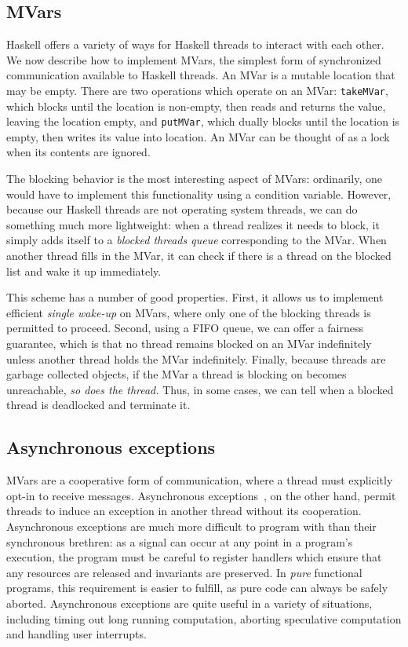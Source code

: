 \subsection{MVars}
\label{sec:MVar}

Haskell offers a variety of ways for Haskell threads to interact with
each other.  We now describe how to implement MVars, the simplest form
of synchronized communication available to Haskell threads.  An MVar is
a mutable location that may be empty.  There are two operations which
operate on an MVar: \verb|takeMVar|, which blocks until the location is
non-empty, then reads and returns the value, leaving the location empty,
and \verb|putMVar|, which dually blocks until the location is empty,
then writes its value into location.  An MVar can be thought of as a
lock when its contents are ignored.

The blocking behavior is the most interesting aspect of MVars:
ordinarily, one would have to implement this functionality using a
condition variable.  However, because our Haskell threads are not
operating system threads, we can do something much more lightweight:
when a thread realizes it needs to block, it simply adds itself to a
\emph{blocked threads queue} corresponding to the MVar.  When another
thread fills in the MVar, it can check if there is a thread on the
blocked list and wake it up immediately.

This scheme has a number of good properties.  First, it allows us
to implement efficient \emph{single wake-up} on MVars, where only one of
the blocking threads is permitted to proceed. Second, using a FIFO
queue, we can offer a fairness guarantee, which is that no thread
remains blocked on an MVar indefinitely unless another thread holds the
MVar indefinitely.  Finally, because threads are garbage collected
objects, if the MVar a thread is blocking on becomes unreachable,
\emph{so does the thread.}  Thus, in some cases, we can tell when
a blocked thread is deadlocked and terminate it.

\subsection{Asynchronous exceptions}
\label{sec:asynchronous-exceptions}

MVars are a cooperative form of communication, where a thread must
explicitly opt-in to receive messages.  Asynchronous
exceptions~\cite{Marlow:2001:AEH:378795.378858}, on the other hand,
permit threads to induce an exception in another thread without its
cooperation.  Asynchronous exceptions are much more difficult to program
with than their synchronous brethren: as a signal can occur at any point
in a program's execution, the program must be careful to register
handlers which ensure that any resources are released and invariants are
preserved.  In \emph{pure} functional programs, this requirement is
easier to fulfill, as pure code can always be safely aborted.
Asynchronous exceptions are quite useful in a variety of situations,
including timing out long running computation, aborting speculative
computation and handling user interrupts.

